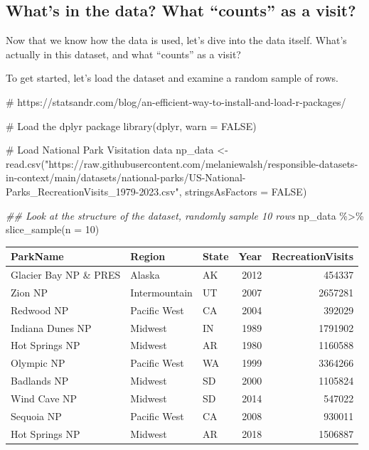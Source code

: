 \documentclass[
  letterpaper,
  DIV=11,
  numbers=noendperiod]{scrartcl}
\newenvironment{Shaded}{\begin{snugshade}}{\end{snugshade}}
\newcommand{\AttributeTok}[1]{\textcolor[rgb]{0.40,0.45,0.13}{#1}}
\newcommand{\CommentTok}[1]{\textcolor[rgb]{0.37,0.37,0.37}{#1}}
\newcommand{\ConstantTok}[1]{\textcolor[rgb]{0.56,0.35,0.01}{#1}}
\newcommand{\DecValTok}[1]{\textcolor[rgb]{0.68,0.00,0.00}{#1}}
\newcommand{\DocumentationTok}[1]{\textcolor[rgb]{0.37,0.37,0.37}{\textit{#1}}}
\newcommand{\FunctionTok}[1]{\textcolor[rgb]{0.28,0.35,0.67}{#1}}
\newcommand{\NormalTok}[1]{\textcolor[rgb]{0.00,0.23,0.31}{#1}}
\newcommand{\OtherTok}[1]{\textcolor[rgb]{0.00,0.23,0.31}{#1}}
\newcommand{\SpecialCharTok}[1]{\textcolor[rgb]{0.37,0.37,0.37}{#1}}
\newcommand{\StringTok}[1]{\textcolor[rgb]{0.13,0.47,0.30}{#1}}
\begin{document}
\subsection{What's in the data? What ``counts'' as a
visit?}\label{whats-in-the-data-what-counts-as-a-visit}

Now that we know how the data is used, let's dive into the data itself.
What's actually in this dataset, and what ``counts'' as a visit?

To get started, let's load the dataset and examine a random sample of
rows.

\begin{Shaded}
\begin{Highlighting}[]
\CommentTok{\# https://statsandr.com/blog/an{-}efficient{-}way{-}to{-}install{-}and{-}load{-}r{-}packages/}

\CommentTok{\# Load the dplyr package}
\FunctionTok{library}\NormalTok{(dplyr, }\AttributeTok{warn =} \ConstantTok{FALSE}\NormalTok{)}

\CommentTok{\# Load National Park Visitation data}
\NormalTok{np\_data }\OtherTok{\textless{}{-}} \FunctionTok{read.csv}\NormalTok{(}\StringTok{"https://raw.githubusercontent.com/melaniewalsh/responsible{-}datasets{-}in{-}context/main/datasets/national{-}parks/US{-}National{-}Parks\_RecreationVisits\_1979{-}2023.csv"}\NormalTok{, }\AttributeTok{stringsAsFactors =} \ConstantTok{FALSE}\NormalTok{)}

\DocumentationTok{\#\# Look at the structure of the dataset, randomly sample 10 rows}
\NormalTok{np\_data }\SpecialCharTok{\%\textgreater{}\%} \FunctionTok{slice\_sample}\NormalTok{(}\AttributeTok{n =} \DecValTok{10}\NormalTok{)}
\end{Highlighting}
\end{Shaded}

\begin{longtable}[]{@{}lllrr@{}}
\toprule\noalign{}
ParkName & Region & State & Year & RecreationVisits \\
\midrule\noalign{}
\endhead
\bottomrule\noalign{}
\endlastfoot
Glacier Bay NP \& PRES & Alaska & AK & 2012 & 454337 \\
Zion NP & Intermountain & UT & 2007 & 2657281 \\
Redwood NP & Pacific West & CA & 2004 & 392029 \\
Indiana Dunes NP & Midwest & IN & 1989 & 1791902 \\
Hot Springs NP & Midwest & AR & 1980 & 1160588 \\
Olympic NP & Pacific West & WA & 1999 & 3364266 \\
Badlands NP & Midwest & SD & 2000 & 1105824 \\
Wind Cave NP & Midwest & SD & 2014 & 547022 \\
Sequoia NP & Pacific West & CA & 2008 & 930011 \\
Hot Springs NP & Midwest & AR & 2018 & 1506887 \\
\end{longtable}
\end{document}
